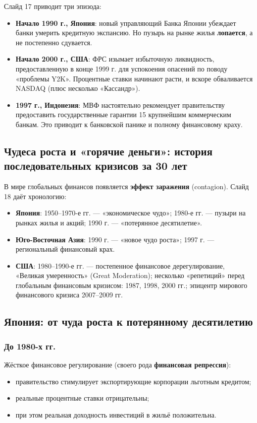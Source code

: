 \documentclass[10pt,a4paper]{article}
\begin{document}
Слайд 17 приводит три эпизода:
\begin{itemize}[leftmargin=1.3em]
\item \textbf{Начало 1990 г., Япония}: новый управляющий Банка Японии убеждает банки умерить кредитную экспансию. Но пузырь на рынке жилья \textbf{лопается}, а не постепенно сдувается.
\item \textbf{Начало 2000 г., США}: ФРС изымает избыточную ликвидность, предоставленную в конце 1999 г. для успокоения опасений по поводу «проблемы Y2K». Процентные ставки начинают расти, и вскоре обваливается NASDAQ (плюс несколько «Кассандр»).
\item \textbf{1997 г., Индонезия}: МВФ настоятельно рекомендует правительству предоставить государственные гарантии 15 крупнейшим коммерческим банкам. Это приводит к банковской панике и полному финансовому краху.
\end{itemize}

\subsection{Чудеса роста и «горячие деньги»: история последовательных кризисов за 30 лет}

В мире глобальных финансов появляется \textbf{эффект заражения} (contagion). Слайд 18 даёт хронологию:
\begin{itemize}[leftmargin=1.3em]
\item \textbf{Япония}: 1950--1970-е гг. — «экономическое чудо»; 1980-е гг. — пузыри на рынках жилья и акций; 1990 г. — «потерянное десятилетие».
\item \textbf{Юго-Восточная Азия}: 1990 г. — «новое чудо роста»; 1997 г. — региональный финансовый крах.
\item \textbf{США}: 1980--1990-е гг. — постепенное финансовое дерегулирование, «Великая умеренность» (Great Moderation); несколько «репетиций» перед глобальным финансовым кризисом: 1987, 1998, 2000 гг.; эпицентр мирового финансового кризиса 2007--2009 гг.
\end{itemize}

\subsection{Япония: от чуда роста к потерянному десятилетию}

\subsubsection{До 1980-х гг.}
Жёсткое финансовое регулирование (своего рода \textbf{финансовая репрессия}):
\begin{itemize}[leftmargin=1.3em]
\item правительство стимулирует экспортирующие корпорации льготным кредитом;
\item реальные процентные ставки отрицательны;
\item при этом реальная доходность инвестиций в жильё положительна.
\end{itemize}
\end{document}
